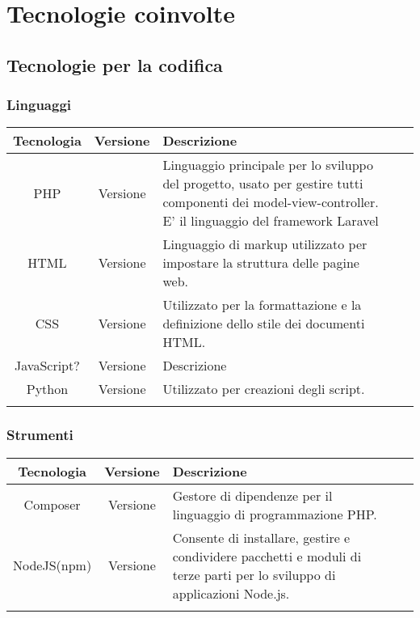 \section{Tecnologie coinvolte}

\subsection{Tecnologie per la codifica}

\subsubsection{Linguaggi}

\begin{center}
\setlength\extrarowheight{5pt}
\renewcommand\tabularxcolumn[1]{>{\Centering}m{#1}}
\begin{tabularx}{\textwidth}{| c | c | X | X | X |} 
	\hline
	\rowcolor{white}
	\textbf{Tecnologia} & \textbf{Versione} & \textbf{Descrizione}\\
	\hline
	PHP & Versione & Linguaggio principale per lo sviluppo del progetto, usato per gestire tutti componenti dei model-view-controller. E' il linguaggio del framework Laravel\\
	\hline
	HTML & Versione & Linguaggio di markup utilizzato per impostare la struttura delle pagine web.\\
	\hline
	CSS & Versione & Utilizzato per la formattazione e la definizione dello stile dei documenti HTML.\\
	\hline
	JavaScript? & Versione & Descrizione\\
	\hline
	Python & Versione & Utilizzato per creazioni degli script.\\
	\hline
	\rowcolor{white}
	\caption{Linguaggi utilizzati}
	\end{tabularx}
\end{center}

\subsubsection{Strumenti}

\begin{center}
\setlength\extrarowheight{5pt}
\renewcommand\tabularxcolumn[1]{>{\Centering}m{#1}}
\begin{tabularx}{\textwidth}{| c | c | X | X | X |} 
	\hline
	\rowcolor{white}
	\textbf{Tecnologia} & \textbf{Versione} & \textbf{Descrizione}\\
	\hline
	Composer & Versione &  Gestore di dipendenze per il linguaggio di programmazione PHP.\\
	\hline
	NodeJS(npm) & Versione & Consente di installare, gestire e condividere pacchetti e moduli di terze parti per lo sviluppo di applicazioni Node.js.\\
	\hline
	\rowcolor{white}
	\caption{Strumenti utilizzati}
	\end{tabularx}
\end{center}

